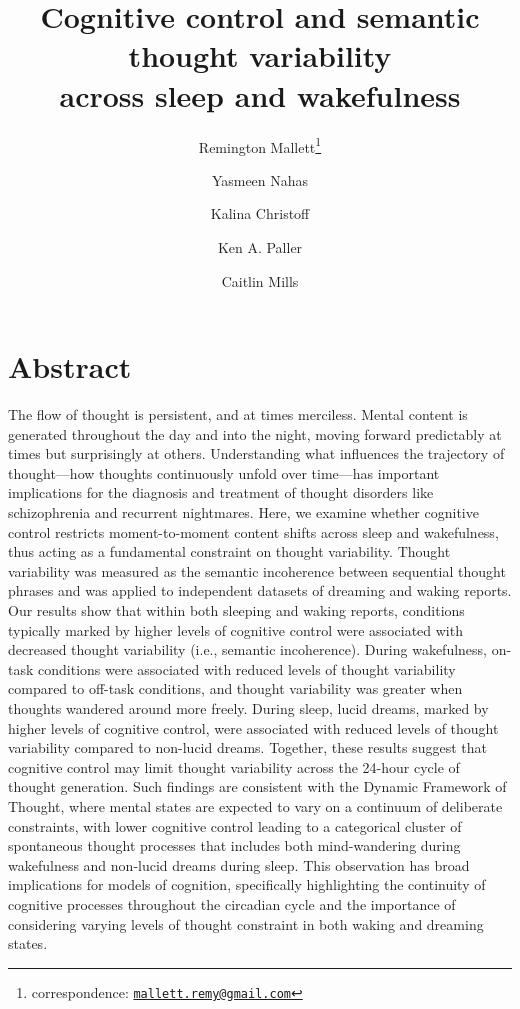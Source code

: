 \documentclass[10pt,a4paper,twocolumn]{article}
\title{\bf Cognitive control and semantic thought variability\\across sleep and wakefulness}
\author[1]{Remington Mallett\thanks{correspondence: \href{mailto:mallett.remy@gmail.com}{\texttt{mallett.remy@gmail.com}}}}
\author[1]{Yasmeen Nahas}
\author[2]{Kalina Christoff}
\author[1]{Ken A. Paller}
\author[3]{Caitlin Mills}
\affil[1]{Department of Psychology, Northwestern University, Evanston, IL, USA}
\affil[2]{Department of Psychology, University of British Columbia, Vancouver, BC, CA}
\affil[3]{Department of Educational Psychology, University of Minnesota, Minneapolis, MN, USA}
\date{}
\begin{document}



\maketitle

\raggedright

\section*{Abstract}
The flow of thought is persistent, and at times merciless. Mental content is generated throughout the day and into the night, moving forward predictably at times but surprisingly at others. Understanding what influences the trajectory of thought---how thoughts continuously unfold over time---has important implications for the diagnosis and treatment of thought disorders like schizophrenia and recurrent nightmares. Here, we examine whether cognitive control restricts moment-to-moment content shifts across sleep and wakefulness, thus acting as a fundamental constraint on thought variability. Thought variability was measured as the semantic incoherence between sequential thought phrases and was applied to independent datasets of dreaming and waking reports. Our results show that within both sleeping and waking reports, conditions typically marked by higher levels of cognitive control were associated with decreased thought variability (i.e., semantic incoherence). During wakefulness, on-task conditions were associated with reduced levels of thought variability compared to off-task conditions, and thought variability was greater when thoughts wandered around more freely. During sleep, lucid dreams, marked by higher levels of cognitive control, were associated with reduced levels of thought variability compared to non-lucid dreams. Together, these results suggest that cognitive control may limit thought variability across the 24-hour cycle of thought generation. Such findings are consistent with the Dynamic Framework of Thought, where mental states are expected to vary on a continuum of deliberate constraints, with lower cognitive control leading to a categorical cluster of spontaneous thought processes that includes both mind-wandering during wakefulness and non-lucid dreams during sleep. This observation has broad implications for models of cognition, specifically highlighting the continuity of cognitive processes throughout the circadian cycle and the importance of considering varying levels of thought constraint in both waking and dreaming states.  
\end{document}
